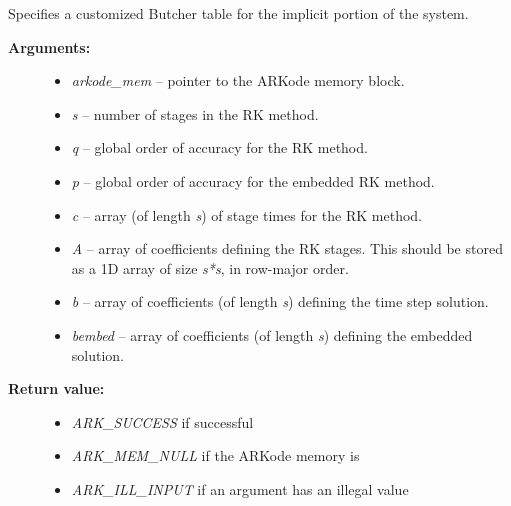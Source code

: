 \documentclass[letterpaper,10pt,english]{sphinxmanual}
\begin{document}
\begin{fulllineitems}
\label{c_interface/User_callable:c.ARKodeSetIRKTable}
Specifies a customized Butcher table for the implicit portion of the system.
\begin{description}
\item[{\textbf{Arguments:}}] \leavevmode\begin{itemize}
\item {} 
\emph{arkode\_mem} -- pointer to the ARKode memory block.

\item {} 
\emph{s} -- number of stages in the RK method.

\item {} 
\emph{q} -- global order of accuracy for the RK method.

\item {} 
\emph{p} -- global order of accuracy for the embedded RK method.

\item {} 
\emph{c} -- array (of length \emph{s}) of stage times for the RK method.

\item {} 
\emph{A} -- array of coefficients defining the RK stages.  This should
be stored as a 1D array of size \emph{s*s}, in row-major order.

\item {} 
\emph{b} -- array of coefficients (of length \emph{s}) defining the time step solution.

\item {} 
\emph{bembed} -- array of coefficients (of length \emph{s}) defining the embedded solution.

\end{itemize}

\item[{\textbf{Return value:}}] \leavevmode\begin{itemize}
\item {} 
\emph{ARK\_SUCCESS} if successful

\item {} 
\emph{ARK\_MEM\_NULL} if the ARKode memory is 

\item {} 
\emph{ARK\_ILL\_INPUT} if an argument has an illegal value


\end{itemize}
\end{description}
\end{fulllineitems}
\end{document}
